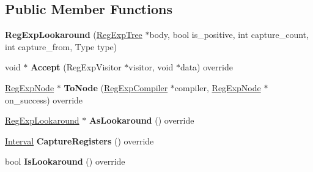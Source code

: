 \subsection*{Public Member Functions}
\begin{DoxyCompactItemize}
\item 
{\bfseries Reg\+Exp\+Lookaround} (\hyperlink{classv8_1_1internal_1_1_reg_exp_tree}{Reg\+Exp\+Tree} $\ast$body, bool is\+\_\+positive, int capture\+\_\+count, int capture\+\_\+from, Type type)\hypertarget{classv8_1_1internal_1_1_reg_exp_lookaround_a676a682119f03effcc975fe41c0936c1}{}\label{classv8_1_1internal_1_1_reg_exp_lookaround_a676a682119f03effcc975fe41c0936c1}

\item 
void $\ast$ {\bfseries Accept} (Reg\+Exp\+Visitor $\ast$visitor, void $\ast$data) override\hypertarget{classv8_1_1internal_1_1_reg_exp_lookaround_a42e3aa3233fca1c15774c62d090e7a9f}{}\label{classv8_1_1internal_1_1_reg_exp_lookaround_a42e3aa3233fca1c15774c62d090e7a9f}

\item 
\hyperlink{classv8_1_1internal_1_1_reg_exp_node}{Reg\+Exp\+Node} $\ast$ {\bfseries To\+Node} (\hyperlink{classv8_1_1internal_1_1_reg_exp_compiler}{Reg\+Exp\+Compiler} $\ast$compiler, \hyperlink{classv8_1_1internal_1_1_reg_exp_node}{Reg\+Exp\+Node} $\ast$on\+\_\+success) override\hypertarget{classv8_1_1internal_1_1_reg_exp_lookaround_aaecf191fb2547c78b12ad372a0467e73}{}\label{classv8_1_1internal_1_1_reg_exp_lookaround_aaecf191fb2547c78b12ad372a0467e73}

\item 
\hyperlink{classv8_1_1internal_1_1_reg_exp_lookaround}{Reg\+Exp\+Lookaround} $\ast$ {\bfseries As\+Lookaround} () override\hypertarget{classv8_1_1internal_1_1_reg_exp_lookaround_a39aca1f129b4c5bb07dc8ef10cc4476c}{}\label{classv8_1_1internal_1_1_reg_exp_lookaround_a39aca1f129b4c5bb07dc8ef10cc4476c}

\item 
\hyperlink{classv8_1_1internal_1_1_interval}{Interval} {\bfseries Capture\+Registers} () override\hypertarget{classv8_1_1internal_1_1_reg_exp_lookaround_a62644443efa0d13d6c44bdae22be1764}{}\label{classv8_1_1internal_1_1_reg_exp_lookaround_a62644443efa0d13d6c44bdae22be1764}

\item 
bool {\bfseries Is\+Lookaround} () override\hypertarget{classv8_1_1internal_1_1_reg_exp_lookaround_a454f240cf27a5c395306a2ff038e163e}{}\label{classv8_1_1internal_1_1_reg_exp_lookaround_a454f240cf27a5c395306a2ff038e163e}


\end{DoxyCompactItemize}

